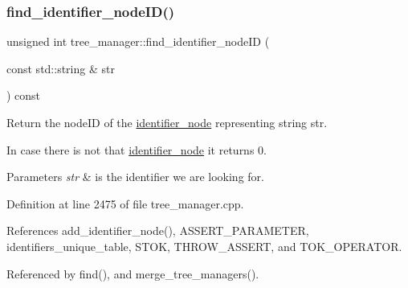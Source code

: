 \subsubsection{\texorpdfstring{find\+\_\+identifier\+\_\+node\+I\+D()}{find\_identifier\_nodeID()}}
{\footnotesize\ttfamily unsigned int tree\+\_\+manager\+::find\+\_\+identifier\+\_\+node\+ID (\begin{DoxyParamCaption}\item[{const std\+::string \&}]{str }\end{DoxyParamCaption}) const}



Return the node\+ID of the \hyperlink{structidentifier__node}{identifier\+\_\+node} representing string str. 

In case there is not that \hyperlink{structidentifier__node}{identifier\+\_\+node} it returns 0. 
\begin{DoxyParams}{Parameters}
{\em str} & is the identifier we are looking for. \\
\hline
\end{DoxyParams}


Definition at line 2475 of file tree\+\_\+manager.\+cpp.



References add\+\_\+identifier\+\_\+node(), A\+S\+S\+E\+R\+T\+\_\+\+P\+A\+R\+A\+M\+E\+T\+ER, identifiers\+\_\+unique\+\_\+table, S\+T\+OK, T\+H\+R\+O\+W\+\_\+\+A\+S\+S\+E\+RT, and T\+O\+K\+\_\+\+O\+P\+E\+R\+A\+T\+OR.



Referenced by find(), and merge\+\_\+tree\+\_\+managers().


